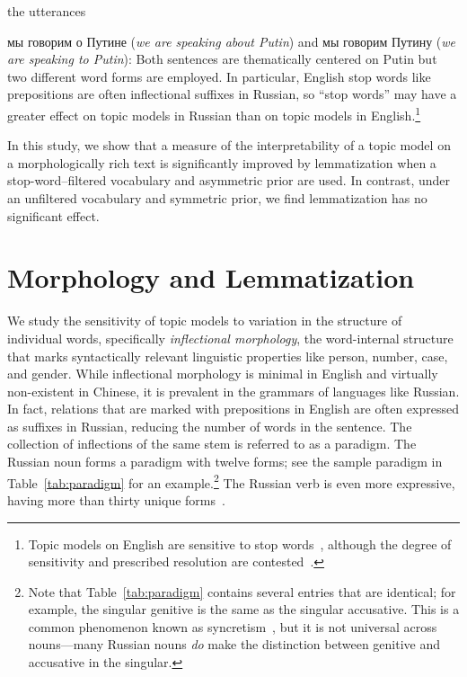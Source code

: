 \documentclass[11pt,letterpaper]{article}
\begin{document}
the utterances {{мы говорим о Путине} ({\em we
are speaking about Putin}) and {{мы
  говорим Путину} ({\em we are speaking to Putin})}: Both sentences
are thematically centered on Putin but two different word forms
are employed.  In particular,
English stop words like prepositions are often inflectional
suffixes in Russian, so ``stop words'' may have a greater effect on
topic models in Russian than on topic models in English.\footnote{
	Topic models on English are sensitive to stop
	words~\cite{wallach2009,blei2010,eisenstein2011},
	although the degree of sensitivity and prescribed
    resolution are contested~\cite{schofield2017}.
}

In this study, we show that a measure of the interpretability of a
topic model on a morphologically rich text is significantly
improved by lemmatization when a stop-word--filtered vocabulary and
asymmetric prior are used.  In contrast, under an unfiltered vocabulary
and symmetric prior, we find lemmatization has no significant effect.


\section{Morphology and Lemmatization}\label{sec:inflectional}

We study the sensitivity of topic models to variation in the structure
of individual words, specifically
{\em inflectional morphology}, the word-internal
structure that marks syntactically relevant linguistic
properties like person, number, case, and gender.
While inflectional morphology is minimal in English and
virtually non-existent in Chinese, it is prevalent in
the grammars of languages like Russian. In fact, relations that are marked with prepositions in English are often expressed as suffixes in Russian, reducing the number of words in the
sentence. The collection of inflections of the same stem is referred to as a
paradigm.  The Russian noun forms a paradigm with twelve
forms; see the sample paradigm in Table~\ref{tab:paradigm} for an
example.\footnote{
  Note that Table~\ref{tab:paradigm} contains several
  entries that are identical; for example, the singular genitive is the same
  as the singular accusative. This is a common phenomenon known as
  syncretism~\cite{baerman2005syntax}, but it is not universal across
  nouns---many Russian nouns {\em do} make the distinction between
  genitive and accusative in the singular.
}
The Russian verb is even more expressive, having more
than thirty unique forms~\cite{wade2010comprehensive}.

}
\end{document}
